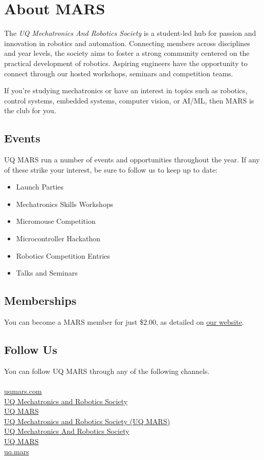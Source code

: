 \chapter{About MARS}
The \textit{UQ Mechatronics And Robotics Society} is a student-led hub for passion and innovation in robotics and automation.
Connecting members across disciplines and year levels, the society aims to foster a strong community centered on the practical development of robotics.
Aspiring engineers have the opportunity to connect through our hosted workshops, seminars and competition teams.

If you're studying mechatronics or have an interest in topics such as robotics, control systems, embedded systems, computer vision, or AI/ML, then MARS is the club for you.

\section{Events}
UQ MARS run a number of events and opportunities throughout the year. If any of these strike your interest, be sure to follow us to keep up to date:
\begin{itemize}
    \item Launch Parties
    \item Mechatronics Skills Workshops
    \item Micromouse Competition
    \item Microcontroller Hackathon
    \item Robotics Competition Entries
    \item Talks and Seminars
\end{itemize}

\section{Memberships}
You can become a MARS member for just \$2.00, as detailed on \href{https://uqmars.com/signup.html}{our website}.

\section{Follow Us}
You can follow UQ MARS through any of the following channels. \\ \\
\faLink{} \href{https://www.uqmars.com}{uqmars.com} \\
\faDiscord{} \href{https://discord.gg/vjY49Q8}{UQ Mechatronics and Robotics Society} \\
\faFacebookSquare{} \href{https://facebook.com/UQMARS}{UQ MARS} \\
\faLinkedin{} \href{https://linkedin.com/company/uq-mars}{UQ Mechatronics and Robotics Society (UQ MARS)} \\
\faGithubSquare{} \href{https://github.com/uqmars}{UQ Mechatronics And Robotics Society} \\
\faYoutube{} \href{https://www.youtube.com/channel/UCH3GjoKLL3R_1ayjkn9C78A}{UQ MARS} \\
\faInstagram{} \href{https://www.instagram.com/uq.mars/}{uq.mars} \\
